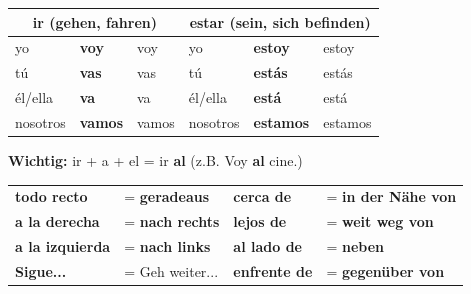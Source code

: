 \documentclass[11pt, a4paper]{article}
\newcommand{\fachfarbe}{spanisch}
\newcommand{\lsg}[1]{\textcolor{loesung}{\textbf{#1}}}
\newcommand{\es}[1]{\textcolor{\fachfarbe}{\textbf{#1}}}
\begin{document}
\begin{merkkasten}

\begin{tabular}{|l|l|l||l|l|l|}
\hline
\multicolumn{3}{|c||}{\textbf{ir} (gehen, fahren)} & \multicolumn{3}{c|}{\textbf{estar} (sein, sich befinden)} \\
\hline
yo & \lsg{voy} & voy & yo & \lsg{estoy} & estoy \\
\hline
tú & \lsg{vas} & vas & tú & \lsg{estás} & estás \\
\hline
él/ella & \lsg{va} & va & él/ella & \lsg{está} & está \\
\hline
nosotros & \lsg{vamos} & vamos & nosotros & \lsg{estamos} & estamos \\
\hline
\end{tabular}

\vspace{0.5em}
\textbf{Wichtig:} ir + a + el = ir \es{al} (z.B. Voy \es{al} cine.)

\end{merkkasten}

\vspace{10pt}


\begin{merkkasten}

\begin{tabular}{ll|ll}
\es{todo recto} & = \lsg{geradeaus} & \es{cerca de} & = \lsg{in der Nähe von} \\[0.5em]
\es{a la derecha} & = \lsg{nach rechts} & \es{lejos de} & = \lsg{weit weg von} \\[0.5em]
\es{a la izquierda} & = \lsg{nach links} & \es{al lado de} & = \lsg{neben} \\[0.5em]
\es{Sigue...} & = Geh weiter... & \es{enfrente de} & = \lsg{gegenüber von} \\[0.5em]
\end{tabular}

\end{merkkasten}

\vspace{15pt}

\end{document}
